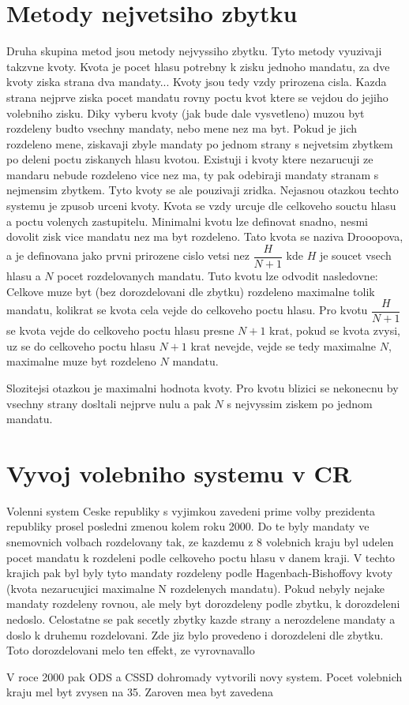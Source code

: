 \documentclass[12pt,a4paper]{article}
\begin{document}
\section{Metody nejvetsiho zbytku}
Druha skupina metod jsou metody nejvyssiho zbytku. Tyto metody vyuzivaji takzvne kvoty. Kvota je pocet hlasu potrebny k zisku jednoho mandatu, za dve kvoty ziska strana dva mandaty... Kvoty jsou tedy vzdy prirozena cisla. Kazda strana nejprve ziska pocet mandatu rovny poctu kvot ktere se vejdou do jejiho volebniho zisku. Diky vyberu kvoty (jak bude dale vysvetleno) muzou byt rozdeleny budto vsechny mandaty, nebo mene nez ma byt. Pokud je jich rozdeleno mene, ziskavaji zbyle mandaty po jednom strany s nejvetsim zbytkem po deleni poctu ziskanych hlasu kvotou. Existuji i kvoty ktere nezarucuji ze mandaru nebude rozdeleno vice nez ma, ty pak odebiraji mandaty stranam s nejmensim zbytkem. Tyto kvoty se ale pouzivaji zridka.
Nejasnou otazkou techto systemu je zpusob urceni kvoty. Kvota se vzdy urcuje dle celkoveho souctu hlasu a poctu volenych zastupitelu. Minimalni kvotu lze definovat snadno, nesmi dovolit zisk vice mandatu nez ma byt rozdeleno. Tato kvota se naziva Drooopova, a je definovana jako prvni prirozene cislo vetsi nez $\dfrac{H}{N+1}$ kde $H$ je soucet vsech hlasu a $N$ pocet rozdelovanych mandatu. Tuto kvotu lze odvodit nasledovne: Celkove muze byt (bez dorozdelovani dle zbytku) rozdeleno maximalne tolik mandatu, kolikrat se kvota cela vejde do celkoveho poctu hlasu. Pro kvotu $\dfrac{H}{N+1}$ se kvota vejde do celkoveho poctu hlasu presne $N+1$ krat, pokud se kvota zvysi, uz se do celkoveho poctu hlasu $N+1$ krat nevejde, vejde se tedy maximalne $N$, maximalne muze byt rozdeleno $N$ mandatu.

Slozitejsi otazkou je maximalni hodnota kvoty. Pro kvotu blizici se nekonecnu by vsechny strany dosltali nejprve nulu a pak $N$ s nejvyssim ziskem po jednom mandatu.

\section{Vyvoj volebniho systemu v CR}
Volenni system Ceske republiky s vyjimkou zavedeni prime volby prezidenta republiky prosel posledni zmenou kolem roku 2000. Do te byly mandaty ve snemovnich volbach rozdelovany tak, ze kazdemu z 8 volebnich kraju byl udelen pocet mandatu k rozdeleni podle celkoveho poctu hlasu v danem kraji. V techto krajich pak byl byly tyto mandaty rozdeleny podle Hagenbach-Bishoffovy kvoty (kvota nezarucujici maximalne N rozdelenych mandatu). Pokud nebyly nejake mandaty rozdeleny rovnou, ale mely byt dorozdeleny podle zbytku, k dorozdeleni nedoslo. Celostatne se pak secetly zbytky kazde strany a nerozdelene mandaty a doslo k druhemu rozdelovani. Zde jiz bylo provedeno i dorozdeleni dle zbytku. Toto dorozdelovani melo ten effekt, ze vyrovnavallo %

V roce 2000 pak ODS a CSSD dohromady vytvorili novy system. Pocet volebnich kraju mel byt zvysen na 35. Zaroven mea byt zavedena 
\end{document}
